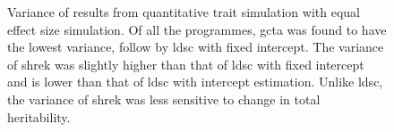 \begin{figure}
{				
				\label{fig:ldscInQtEqualVar}
			}
			\caption[Quantitative Trait with Equal Effect Size Simulation Result(Variance)]
			{Variance of results from quantitative trait simulation with equal effect size simulation.
				Of all the programmes, \gls{gcta} was found to have the lowest variance, follow by \gls{ldsc} with fixed intercept.
				The variance of \gls{shrek} was slightly higher than that of \gls{ldsc} with fixed intercept and is lower than that of \gls{ldsc} with intercept estimation.
				Unlike \gls{ldsc}, the variance of \gls{shrek} was less sensitive to change in total heritability.} 
			\label{fig:QtEqualVar}
		\end{figure}
		
